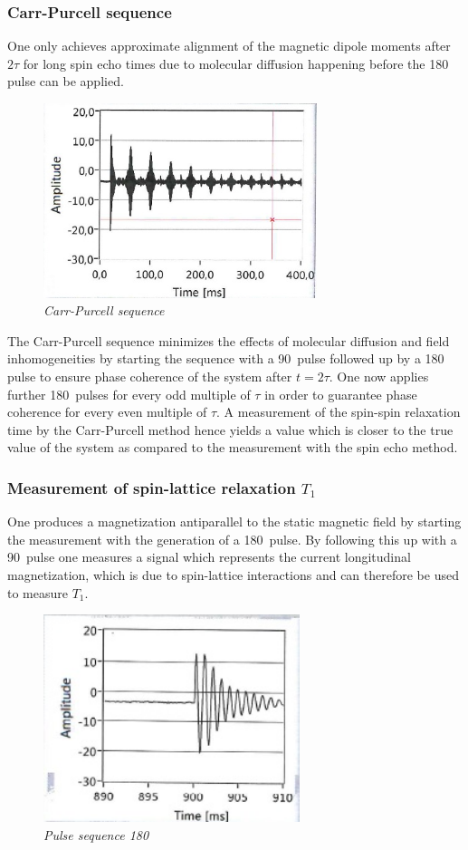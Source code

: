 \subsubsection{Carr-Purcell sequence}
\label{sec:2}
One only achieves approximate alignment of the magnetic dipole moments after $2 \tau$ for long spin echo times due to molecular diffusion happening before the 180 \textdegree\, pulse can be applied.
\begin{figure}[h]
	\includegraphics[width=80mm]{CarrPurcell}
	\centering
	\caption{\itshape Carr-Purcell sequence}
	\label{fig:2}
\end{figure} 
\noindent
 The Carr-Purcell sequence minimizes the effects of molecular diffusion and field inhomogeneities by starting the sequence with a 90\textdegree\, pulse followed up by a 180 \textdegree\, pulse to ensure phase coherence of the system after $t=2\tau$. One now applies further 180\textdegree\, pulses for every odd multiple of $\tau$ in order to guarantee phase coherence for every even multiple of $\tau$.
A measurement of the spin-spin relaxation time by the Carr-Purcell method hence yields a value which is closer to the true value of the system as compared to the measurement with the spin echo method.\cite{manual}
\label{sec:5}

\subsubsection{Measurement of spin-lattice relaxation $T_1$}

One produces a magnetization antiparallel to the static magnetic field by starting the measurement with the generation of a 180\textdegree\, pulse. By following this up with a 90\textdegree\, pulse one measures a signal which represents the current longitudinal magnetization, which is due to spin-lattice interactions and can therefore be used to measure $T_1$.\cite{manual}
\begin{figure}[h]
\includegraphics[width=75mm]{T_1}
\centering
\caption{\itshape Pulse sequence 180  \textdegree}
\label{fig:3}
\end{figure}
